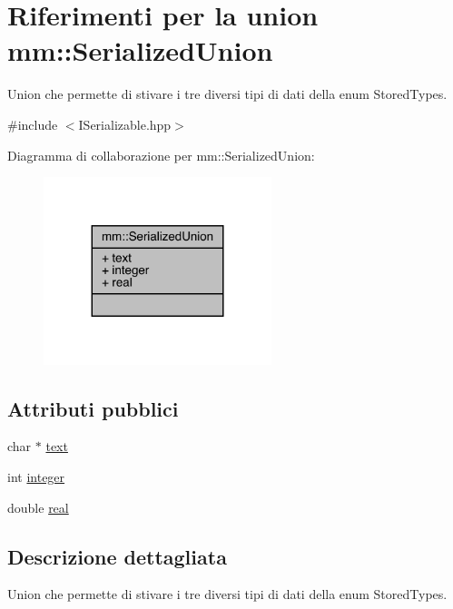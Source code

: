 \hypertarget{unionmm_1_1_serialized_union}{}\section{Riferimenti per la union mm\+:\+:Serialized\+Union}
\label{unionmm_1_1_serialized_union}


Union che permette di stivare i tre diversi tipi di dati della enum Stored\+Types.  




{\ttfamily \#include $<$I\+Serializable.\+hpp$>$}



Diagramma di collaborazione per mm\+:\+:Serialized\+Union\+:
\nopagebreak
\begin{figure}[H]
\begin{center}
\leavevmode
\includegraphics[width=188pt]{d5/d2a/unionmm_1_1_serialized_union__coll__graph}
\end{center}
\end{figure}
\subsection*{Attributi pubblici}
\begin{DoxyCompactItemize}
\item 
char $\ast$ \mbox{\hyperlink{unionmm_1_1_serialized_union_a8d0497571c8ac717f7f49226477f13bf}{text}}
\item 
int \mbox{\hyperlink{unionmm_1_1_serialized_union_ab1b4916d7e61e14280d62aecf668d402}{integer}}
\item 
double \mbox{\hyperlink{unionmm_1_1_serialized_union_a315b1f30581d381d4ce1bb980641a200}{real}}
\end{DoxyCompactItemize}


\subsection{Descrizione dettagliata}
Union che permette di stivare i tre diversi tipi di dati della enum Stored\+Types. 

